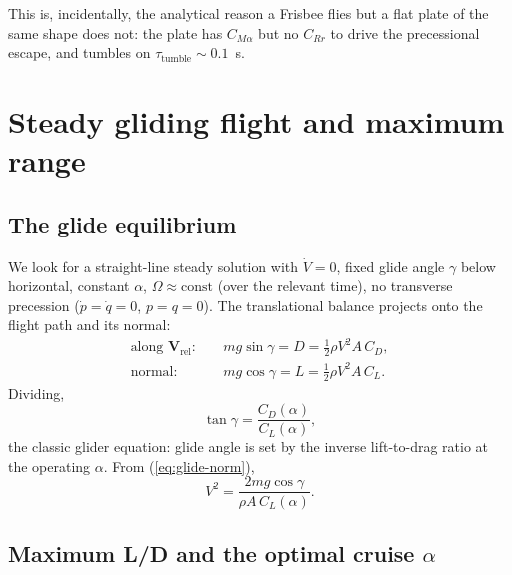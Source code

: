 \documentclass[11pt,letterpaper]{article}
\begin{document}
This is, incidentally, the analytical reason a Frisbee flies but a flat plate of the same shape does not: the plate has $C_{M\alpha}$ but no $C_{Rr}$ to drive the precessional escape, and tumbles on $\tau_{\text{tumble}} \sim 0.1$~s.

\section{Steady gliding flight and maximum range}
\label{sec:glide}

\subsection{The glide equilibrium}

We look for a straight-line steady solution with $\dot{V} = 0$, fixed glide angle $\gamma$ below horizontal, constant $\alpha$, $\Omega \approx \text{const}$ (over the relevant time), no transverse precession ($\dot{p} = \dot{q} = 0$, $p = q = 0$). The translational balance projects onto the flight path and its normal:
\begin{align}
\text{along } \mathbf{V}_{\text{rel}}: & \quad mg \sin\gamma = D = \tfrac{1}{2}\rho V^2 A\, C_D, \label{eq:glide-along}\\
\text{normal:} & \quad mg \cos\gamma = L = \tfrac{1}{2}\rho V^2 A\, C_L. \label{eq:glide-norm}
\end{align}
Dividing,
\begin{equation}
\tan\gamma = \frac{C_D(\alpha)}{C_L(\alpha)},
\label{eq:tan-glide}
\end{equation}
the classic glider equation: glide angle is set by the inverse lift-to-drag ratio at the operating $\alpha$. From (\ref{eq:glide-norm}),
\begin{equation}
V^2 = \frac{2 m g \cos\gamma}{\rho A\,C_L(\alpha)}.
\label{eq:V-glide}
\end{equation}

\subsection{Maximum L/D and the optimal cruise $\alpha$}
\end{document}
